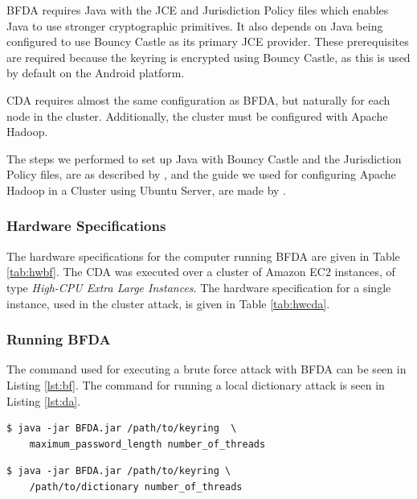 \documentclass[pdftex,english,10pt,b5paper,twoside]{book}
\begin{document}
\ac{BFDA} requires Java with the \ac{JCE} and Jurisdiction Policy files which
enables Java to use stronger cryptographic primitives. It also depends on Java
being configured to use Bouncy Castle as its primary \ac{JCE} provider. These
prerequisites are required because the keyring is encrypted using Bouncy
Castle, as this is used by default on the Android platform.

\ac{CDA} requires almost the same configuration as \ac{BFDA}, but naturally for
each node in the cluster. Additionally, the cluster must be configured with
Apache Hadoop.

The steps we performed to set up Java with Bouncy Castle and the Jurisdiction
Policy files, are as described by \citet{jce+bc}, and the guide we used for
configuring Apache Hadoop in a Cluster using Ubuntu Server, are made by
\citet{cluster}.

\subsubsection{Hardware Specifications}

The hardware specifications for the computer running \acl{BFDA} are given in
Table \ref{tab:hwbf}. The \acl{CDA} was executed over a cluster of Amazon
\ac{EC2} instances, of type \emph{High-CPU Extra Large Instances}. The hardware
specification for a single instance, used in the cluster attack, is given in
Table \ref{tab:hwcda}.



\subsubsection{Running \ac{BFDA}}

The command used for executing a brute force attack with \ac{BFDA} can be
seen in Listing \ref{lst:bf}. The command for running a local dictionary attack
is seen in Listing \ref{lst:da}.

\lstset{label=lst:bf, caption=Running local brute force attack}
\begin{lstlisting}
$ java -jar BFDA.jar /path/to/keyring  \
    maximum_password_length number_of_threads
\end{lstlisting}

\lstset{label=lst:da, caption=Running local dictionary attack}
\begin{lstlisting}
$ java -jar BFDA.jar /path/to/keyring \
    /path/to/dictionary number_of_threads
\end{lstlisting}
\end{document}
